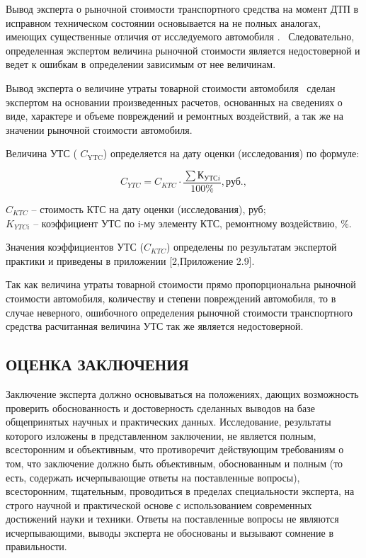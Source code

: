 Вывод эксперта о рыночной стоимости транспортного средства   на момент ДТП в исправном техническом состоянии основывается на не полных аналогах, имеющих существенные отличия от исследуемого автомобиля . \, Следовательно, определенная экспертом  величина рыночной  стоимости является недостоверной и ведет к ошибкам в определении зависимым от нее величинам. 

Вывод эксперта о величине утраты товарной стоимости автомобиля  \, сделан экспертом на основании произведенных расчетов, основанных на сведениях о виде, характере и объеме повреждений и ремонтных воздействий, а так же на значении рыночной стоимости автомобиля.   
\par Величина УТС ( $ C_\text{YTC} $)  определяется на дату оценки (исследования) по формуле: 

\begin{equation}\label{uts}
C_{YTC} = C_{KTC} \cdot \dfrac{\sum К_{УТСi}}{100\%}, \text{руб.},
\end{equation}

\noindent $ C_{KTC} $ -- стоимость КТС на дату оценки (исследования), руб;\\
$ K_{YTCi} $ -- коэффициент УТС по i-му элементу КТС, ремонтному воздействию, \%. 
\par Значения коэффициентов УТС ($ C_{KTC} $) определены по результатам экспертой практики и приведены в приложении [2,Приложение 2.9].

\par Так как величина утраты товарной стоимости прямо пропорциональна рыночной стоимости  автомобиля, количеству и степени повреждений автомобиля, то в случае неверного, ошибочного определения рыночной стоимости  транспортного средства расчитанная величина  УТС  так же  является недостоверной.
 


\subsection{ ОЦЕНКА ЗАКЛЮЧЕНИЯ}


Заключение эксперта должно основываться на положениях, дающих возможность проверить обоснованность и достоверность сделанных выводов на базе общепринятых научных и практических данных. Исследование, результаты которого изложены в представленном заключении, не является полным, всесторонним и объективным, что противоречит действующим требованиям о том, что заключение должно быть объективным, обоснованным и полным (то есть, содержать исчерпывающие ответы на поставленные вопросы), всесторонним, тщательным, проводиться в пределах специальности эксперта, на строго научной и практической основе с использованием современных достижений науки и техники. Ответы на поставленные вопросы не являются исчерпывающими, выводы эксперта не обоснованы и вызывают сомнение в правильности.


